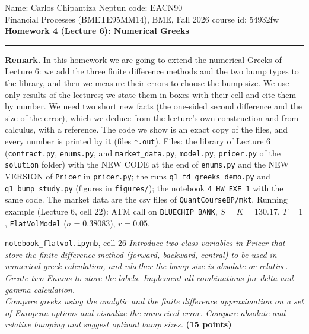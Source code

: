 \documentclass[11pt,a4paper]{article}
\newcommand{\subhead}[1]{\par\medskip\noindent{\large\bfseries #1}\par\smallskip\noindent\ignorespaces}
\renewcommand{\subhead}[1]{\par\medskip\needspace{8\baselineskip}\noindent{\large\bfseries #1}\par\smallskip\noindent\ignorespaces}
\begin{document}
\noindent Name: Carlos Chipantiza \hfill Neptun code: EACN90\\
\noindent Financial Processes (BMETE95MM14), BME, Fall 2026 \hfill course id: 54932fw\\[2pt]
{\large\textbf{Homework 4 (Lecture 6): Numerical Greeks}}\\[2pt]
\noindent\rule{\textwidth}{0.4pt}

\noindent\textbf{Remark.} In this homework we are going to extend the numerical Greeks of Lecture 6: we add the three finite difference methods and the two bump types to the library, and then we measure their errors to choose the bump size. We use only results of the lectures; we state them in boxes with their cell and cite them by number. We need two short new facts (the one-sided second difference and the size of the error), which we deduce from the lecture's own construction and from calculus, with a reference. The code we show is an exact copy of the files, and every number is printed by it (files \texttt{*.out}). Files: the library of Lecture 6 (\texttt{contract.py}, \texttt{enums.py}, and \texttt{market\_data.py}, \texttt{model.py}, \texttt{pricer.py} of the \texttt{solution} folder) with the NEW CODE at the end of \texttt{enums.py} and the NEW VERSION of \texttt{Pricer} in \texttt{pricer.py}; the runs \texttt{q1\_fd\_greeks\_demo.py} and \texttt{q1\_bump\_study.py} (figures in \texttt{figures/}); the notebook \texttt{4\_HW\_EXE\_1} with the same code. The market data are the csv files of \texttt{QuantCourseBP/mkt}. Running example (Lecture 6, cell 22): ATM call on \texttt{BLUECHIP\_BANK}, $S=K=130.17$, $T=1$, \texttt{FlatVolModel} ($\sigma=0.38083$), $r=0.05$.

\subhead{1. The assignment.}
\begin{stmbox}{\texttt{notebook\_flatvol.ipynb}, cell 26}
\emph{Introduce two class variables in Pricer that store the finite difference method (forward, backward, central) to be used in numerical greek calculation, and whether the bump size is absolute or relative. Create two Enums to store the labels. Implement all combinations for delta and gamma calculation.\\
Compare greeks using the analytic and the finite difference approximation on a set of European options and visualize the numerical error. Compare absolute and relative bumping and suggest optimal bump sizes.} \textbf{(15 points)}
\end{stmbox}
\end{document}
